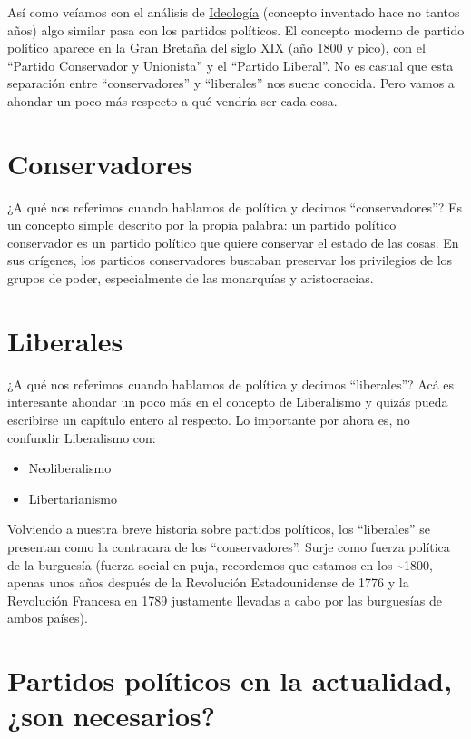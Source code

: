 \documentclass[
]{book}
\begin{document}
Así como veíamos con el análisis de \protect\hyperlink{ideologuxeda}{Ideología} (concepto inventado hace no tantos años) algo similar pasa con los partidos políticos. El concepto moderno de partido político aparece en la Gran Bretaña del siglo XIX (año 1800 y pico), con el ``Partido Conservador y Unionista'' y el ``Partido Liberal''. No es casual que esta separación entre ``conservadores'' y ``liberales'' nos suene conocida. Pero vamos a ahondar un poco más respecto a qué vendría ser cada cosa.

\hypertarget{conservadores}{%
\section{Conservadores}\label{conservadores}}

¿A qué nos referimos cuando hablamos de política y decimos ``conservadores''? Es un concepto simple descrito por la propia palabra: un partido político conservador es un partido político que quiere conservar el estado de las cosas. En sus orígenes, los partidos conservadores buscaban preservar los privilegios de los grupos de poder, especialmente de las monarquías y aristocracias.

\hypertarget{liberales}{%
\section{Liberales}\label{liberales}}

¿A qué nos referimos cuando hablamos de política y decimos ``liberales''? Acá es interesante ahondar un poco más en el concepto de Liberalismo y quizás pueda escribirse un capítulo entero al respecto. Lo importante por ahora es, no confundir Liberalismo con:

\begin{itemize}
\item
  Neoliberalismo
\item
  Libertarianismo
\end{itemize}

Volviendo a nuestra breve historia sobre partidos políticos, los ``liberales'' se presentan como la contracara de los ``conservadores''. Surje como fuerza política de la burguesía (fuerza social en puja, recordemos que estamos en los \textasciitilde1800, apenas unos años después de la Revolución Estadounidense de 1776 y la Revolución Francesa en 1789 justamente llevadas a cabo por las burguesías de ambos países).

\hypertarget{partidos-poluxedticos-en-la-actualidad-son-necesarios}{%
\section{Partidos políticos en la actualidad, ¿son necesarios?}\label{partidos-poluxedticos-en-la-actualidad-son-necesarios}}
\end{document}
